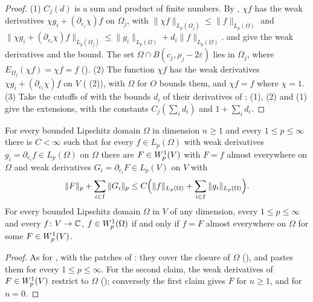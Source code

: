 \begin{proof}
\leanok
(1) $C_j(d)$ is a sum and product of finite numbers. By , $\chi f$
has the weak derivatives $\chi g_i + (\partial_{e_i} \chi) f$ on $\Omega_j$, with
$\|\chi f\|_{L_p(\Omega_j)} \leq \|f\|_{L_p(\Omega)}$ and
$\|\chi g_i + (\partial_{e_i} \chi) f\|_{L_p(\Omega_j)} \leq \|g_i\|_{L_p(\Omega)} + d_i
\|f\|_{L_p(\Omega)}$.  and
 give the weak derivatives and the bound. The set
$\Omega \cap B(c_j, \rho_j - 2 \varepsilon)$ lies in $\Omega_j$, where
$E_{\Omega_j}(\chi f) = \chi f = f$ (). (2) The function $\chi f$ has
the weak derivatives $\chi g_i + (\partial_{e_i} \chi) f$ on $V$
( (2)),  with $\Omega$ for
$O$ bounds them, and $\chi f = f$ where $\chi = 1$. (3) Take the cutoffs of
 with the bounds $d_i$ of their derivatives of
; (1), (2) and
 (1) give the extensions, with the constants
$C_j(\sum_i d_i)$ and $1 + \sum_i d_i$.
\end{proof}

\begin{theorem}
\label{thm:reflection-extension}
\leanok
{}
For every bounded Lipschitz domain $\Omega$ in dimension $n \geq 1$ and every
$1 \leq p \leq \infty$ there is $C < \infty$ such that for every $f \in L_p(\Omega)$ with weak
derivatives $g_i = \partial_{e_i} f \in L_p(\Omega)$ on $\Omega$ there are $F \in W^{1}_{p}(V)$
with $F = f$ almost everywhere on $\Omega$ and weak derivatives
$G_i = \partial_{e_i} F \in L_p(V)$ on $V$ with
\[
  \|F\|_p + \sum_{i \in I} \|G_i\|_p \leq C \Bigl(\|f\|_{L_p(\Omega)} + \sum_{i \in I}
  \|g_i\|_{L_p(\Omega)}\Bigr) .
\]
For every bounded Lipschitz domain $\Omega$ in $V$ of any dimension, every $1 \leq p \leq \infty$
and every $f \colon V \to \mathbb{C}$, $f \in W^{1}_{p}(\Omega)$ if and only if $f = F$ almost everywhere
on $\Omega$ for some $F \in W^{1}_{p}(V)$.
\end{theorem}

\begin{proof}
\leanok
As for , with the patches of : they
cover the closure of $\Omega$ (), and
 pastes them for every $1 \leq p \leq \infty$. For the second claim,
the weak derivatives of $F \in W^{1}_{p}(V)$ restrict to $\Omega$
(); conversely the first claim gives $F$ for $n \geq 1$, and
 for $n = 0$.
\end{proof}


